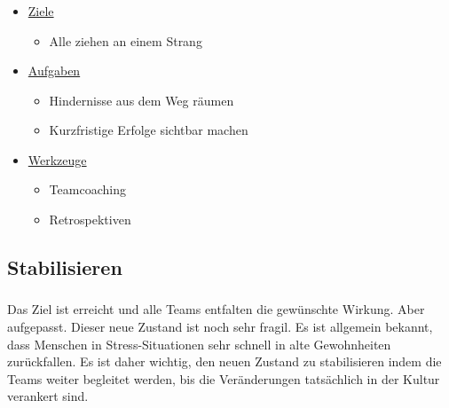 \documentclass[aspectratio=169]{beamer}
\begin{document}
\begin{frame}
\frametitle{\subsecname}\framesubtitle{\secname}
\begin{itemize}
\setlength\itemsep{1em}
\item[\color{ipt-red}{\selectfont$\approx$}]\underline{Ziele}
\begin{itemize}
  \item Alle ziehen an einem Strang
\end{itemize}
\item[\color{ipt-red}{\selectfont$\approx$}]\underline{Aufgaben}
\begin{itemize}
\item Hindernisse aus dem Weg räumen
\item Kurzfristige Erfolge sichtbar machen
\end{itemize}
\item[\color{ipt-red}{\selectfont$\approx$}]\underline{Werkzeuge}
\begin{itemize}
  \item Teamcoaching
  \item Retrospektiven
\end{itemize}
\end{itemize}
\end{frame}

\subsection{Stabilisieren}
\begin{frame}
\frametitle{\subsecname}\framesubtitle{\secname}
Das Ziel ist erreicht und alle Teams entfalten die gewünschte Wirkung. Aber aufgepasst. Dieser neue Zustand ist noch sehr fragil. Es ist allgemein bekannt, dass Menschen in Stress-Situationen sehr schnell in alte Gewohnheiten zurückfallen. Es ist daher wichtig, den neuen Zustand zu stabilisieren indem die Teams weiter begleitet werden, bis die Veränderungen tatsächlich in der Kultur verankert sind.
\end{frame}
\end{document}
